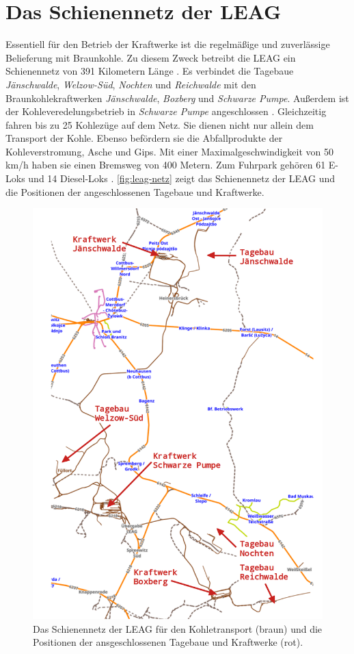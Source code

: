 \section{Das Schienennetz der LEAG}

Essentiell für den Betrieb der Kraftwerke ist die regelmäßige und zuverlässige Belieferung mit Braunkohle. Zu diesem Zweck betreibt die LEAG  ein Schienennetz von 391 Kilometern Länge \cite{hertzer_eisenbahner_2018}. Es verbindet die Tagebaue \emph{Jänschwalde}, \emph{Welzow-Süd}, \emph{Nochten} und \emph{Reichwalde} mit den Braunkohlekraftwerken \emph{Jänschwalde}, \emph{Boxberg} und \emph{Schwarze Pumpe}. Außerdem ist der Kohleveredelungsbetrieb in \emph{Schwarze Pumpe} angeschlossen \cite{noauthor_tagebau_2023}. Gleichzeitig fahren bis zu 25 Kohlezüge auf dem Netz. Sie dienen nicht nur allein dem Transport der Kohle. Ebenso befördern sie die Abfallprodukte der Kohleverstromung, Asche und Gips. Mit einer Maximalgeschwindigkeit von 50 km/h haben sie einen Bremsweg von 400 Metern. Zum Fuhrpark gehören 61 E-Loks und 14 Diesel-Loks \cite{hertzer_eisenbahner_2018}. \autoref{fig:leag-netz} zeigt das Schienennetz der LEAG und die Positionen der angeschlossenen Tagebaue und Kraftwerke.

\begin{figure}[!ht]
	\centering
	\includegraphics[width=0.75\linewidth]{images/LEAG-Netz-annotated.png}
	\caption{Das Schienennetz der LEAG für den Kohletransport (braun) und die Positionen der ansgeschlossenen Tagebaue und Kraftwerke (rot).}
	\label{fig:leag-netz}
\end{figure}